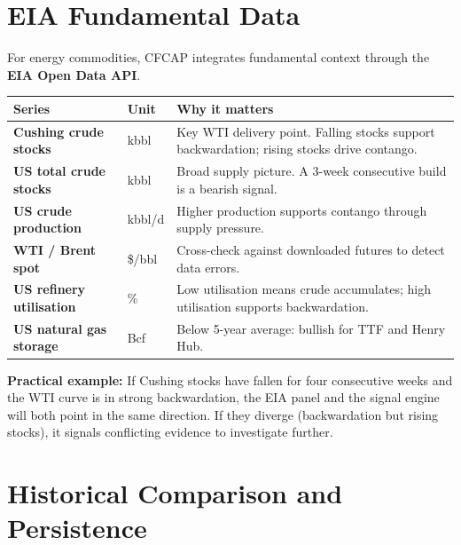 \documentclass[11pt,a4paper]{article}
\newenvironment{notebox}{%
  \begin{tcolorbox}[
    colback=notebg, colframe=noteborder,
    left=8pt, right=8pt, top=5pt, bottom=5pt, boxrule=0.5pt
  ]
}{\end{tcolorbox}}
\begin{document}
\section{EIA Fundamental Data}

For energy commodities, CFCAP integrates fundamental context through the
\textbf{EIA Open Data API}.

\begin{center}
\begin{tabularx}{\textwidth}{>{\bfseries}l l X}
\toprule
Series & Unit & Why it matters \\
\midrule
Cushing crude stocks    & kbbl   & Key WTI delivery point. Falling stocks support backwardation; rising stocks drive contango. \\
US total crude stocks   & kbbl   & Broad supply picture. A 3-week consecutive build is a bearish signal. \\
US crude production     & kbbl/d & Higher production supports contango through supply pressure. \\
WTI / Brent spot        & \$/bbl & Cross-check against downloaded futures to detect data errors. \\
US refinery utilisation & \%     & Low utilisation means crude accumulates; high utilisation supports backwardation. \\
US natural gas storage  & Bcf    & Below 5-year average: bullish for TTF and Henry Hub. \\
\bottomrule
\end{tabularx}
\end{center}

\begin{notebox}
\textbf{Practical example:} If Cushing stocks have fallen for four consecutive weeks and the WTI curve is in strong backwardation, the EIA panel and the signal engine will both point in the same direction. If they diverge (backwardation but rising stocks), it signals conflicting evidence to investigate further.
\end{notebox}

\section{Historical Comparison and Persistence}
\end{document}
